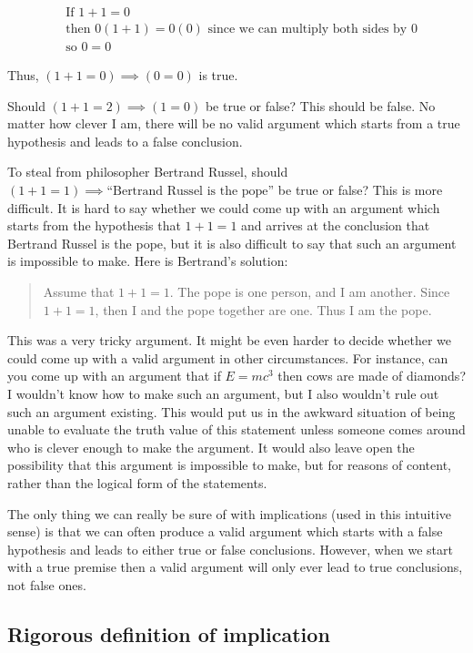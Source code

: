 \begin{align*}
	&\textrm{If } 1+1 = 0 \\
	&\textrm{then } 0(1+1)  = 0(0) \textrm{ since we can multiply both sides by $0$}\\
	&\textrm{so } 0=0 
\end{align*}

Thus, $(1+1 = 0) \implies (0 = 0)$ is true.

Should $(1+1 = 2) \implies (1 = 0)$ be true or false?  This should be false.  No matter how clever I am, there will be no valid argument which starts from a true hypothesis and leads to a false conclusion.

To steal from philosopher Bertrand Russel, should  $(1+1 = 1) \implies \textrm{``Bertrand Russel is the pope''}$ be true or false?  This is more difficult.  It is hard to say whether we could come up with an argument which starts from the hypothesis that $1+1 = 1$ and arrives at the conclusion that Bertrand Russel is the pope, but it is also difficult to say that such an argument is impossible to make.  Here is Bertrand's solution:

\begin{quote}
		Assume that $1+1 = 1$.
		The pope is one person, and I am another.
		Since $1+1 = 1$, then I and the pope together are one.
		Thus I am the pope.
	\end{quote}

This was a very tricky argument.  It might be even harder to decide whether we could come up with a valid argument in other circumstances.  For instance, can you come up with an argument that if $E = mc^3$ then cows are made of diamonds?  I wouldn't know how to make such an argument, but I also wouldn't rule out such an argument existing.  This would put us in the awkward situation of being unable to evaluate the truth value of this statement unless someone comes around who is clever enough to make the argument.  It would also leave open the possibility that this argument is impossible to make, but for reasons of content, rather than the logical form of the statements.

The only thing we can really be sure of with implications (used in this intuitive sense) is that we can often produce a valid argument which starts with a false hypothesis and leads to either true or false conclusions.  However, when we start with a true premise then a valid argument will only ever lead to true conclusions, not false ones.

\subsection{Rigorous definition of implication}

